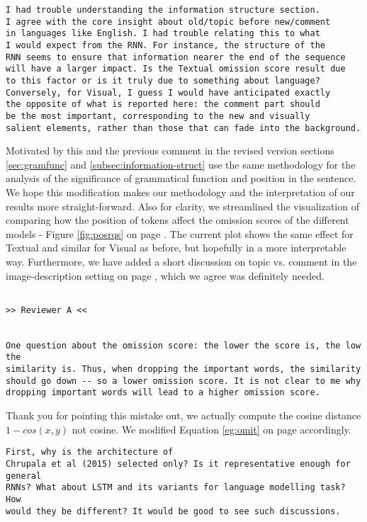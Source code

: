 \documentclass{article}
\begin{document}
\begin{verbatim}
I had trouble understanding the information structure section. 
I agree with the core insight about old/topic before new/comment 
in languages like English. I had trouble relating this to what 
I would expect from the RNN. For instance, the structure of the 
RNN seems to ensure that information nearer the end of the sequence
will have a larger impact. Is the Textual omission score result due 
to this factor or is it truly due to something about language? 
Conversely, for Visual, I guess I would have anticipated exactly 
the opposite of what is reported here: the comment part should
be the most important, corresponding to the new and visually 
salient elements, rather than those that can fade into the background.
\end{verbatim}

Motivated by this and the previous comment in the revised version
sections \ref{sec:gramfunc} and \ref{subsec:information-struct} use the same methodology
for the analysis of the significance of grammatical function and position in the sentence.
We hope this modification makes our methodology and the interpretation of our 
results more straight-forward. Also for clarity, we streamlined the visualization
of comparing how the position of tokens affect the omission scores of the different models
- Figure \ref{fig:posrqs} on page \pageref{fig:posrqs}. 
The current plot shows the same effect for {\sc Textual}
and similar for {\sc Visual} as before, but hopefully in a more interpretable
way. Furthermore, we have added a short discussion 
on topic vs. comment in the image-description setting on page 
\pageref{edit:topiccomment}, which we agree was definitely needed.


\begin{verbatim}

>> Reviewer A <<


One question about the omission score: the lower the score is, the low the
similarity is. Thus, when dropping the important words, the similarity
should go down -- so a lower omission score. It is not clear to me why
dropping important words will lead to a higher omission score.

\end{verbatim}

Thank you for pointing this mistake out, we actually
compute the cosine distance $1-cos(x,y)$ not cosine.
We modified Equation \ref{eg:omit} on page \pageref{eg:omit} accordingly.

\begin{verbatim}
First, why is the architecture of
Chrupala et al (2015) selected only? Is it representative enough for general
RNNs? What about LSTM and its variants for language modelling task? How
would they be different? It would be good to see such discussions. 
\end{verbatim}
\end{document}
